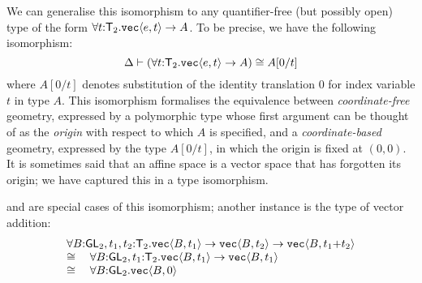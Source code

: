 We can generalise this isomorphism to any quantifier-free (but possibly open) type
of the form $\forall t\mathord:\mathsf{T}_2.\textup{\texttt{vec}}\langle e,t \rangle\to A$. 
To be precise, we have the following isomorphism:
\[
\Delta\vdash(\forall t\mathord:\mathsf{T}_2.\textup{\texttt{vec}}\langle e,t \rangle\to A)
\cong A[0/t]
\]
where $A[0/t]$ denotes substitution of the identity translation $0$
for index variable $t$ in type $A$. This isomorphism formalises the
equivalence between \emph{coordinate-free} geometry, expressed by a
polymorphic type whose first argument can be thought of as the
\emph{origin} with respect to which $A$ is specified, and a
\emph{coordinate-based} geometry, expressed by the type $A[0/t]$, in
which the origin is fixed at $(0,0)$. It is sometimes said that an
affine space is a vector space that has forgotten its origin; we have
captured this in a type isomorphism.

 and  are special cases of this isomorphism; another instance is the
type of vector addition:
\[
\begin{array}{l}
\forall B\mathord:\mathsf{GL}_2, t_1
, t_2\mathord:\mathsf{T}_2.\textup{\texttt{vec}}\langle B,t_1 \rangle\to\textup{\texttt{vec}}\langle B,t_2 \rangle\to\textup{\texttt{vec}}\langle B,t_1\mathord+t_2 \rangle\\
\cong\quad
\forall B\mathord:\mathsf{GL}_2, t_1\mathord:\mathsf{T}_2.\textup{\texttt{vec}}\langle B,t_1 \rangle\to\textup{\texttt{vec}}\langle B,t_1 \rangle\\
\cong\quad
\forall B\mathord:\mathsf{GL}_2.\textup{\texttt{vec}}\langle B,0 \rangle
\end{array}
\]
\noindent
\newcommand{\transup}[3]{\mathord\uparrow_{#1}^{#2\mathord:#3}}
\newcommand{\transdn}[3]{\mathord\downarrow_{#1}^{#2\mathord:#3}}

